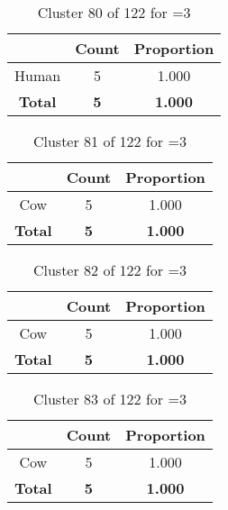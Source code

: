 \clearpage
\begin{table}[ht!]
\centering
\begin{tabular}{|c|c|c|}
\hline
\bf \Spec{} &\bf Count &\bf Proportion\\ \hline \hline
Human & 5 & 1.000\\ \hline
\hline
\bf Total & \bf 5 & \bf 1.000\\ \hline
\end{tabular}
\label{tab:cluster:80:3}
\caption{Cluster 80 of 122 for \minneigh{}=3}
\end{table}

\begin{table}[ht!]
\centering
\begin{tabular}{|c|c|c|}
\hline
\bf \Spec{} &\bf Count &\bf Proportion\\ \hline \hline
Cow & 5 & 1.000\\ \hline
\hline
\bf Total & \bf 5 & \bf 1.000\\ \hline
\end{tabular}
\label{tab:cluster:81:3}
\caption{Cluster 81 of 122 for \minneigh{}=3}
\end{table}

\begin{table}[ht!]
\centering
\begin{tabular}{|c|c|c|}
\hline
\bf \Spec{} &\bf Count &\bf Proportion\\ \hline \hline
Cow & 5 & 1.000\\ \hline
\hline
\bf Total & \bf 5 & \bf 1.000\\ \hline
\end{tabular}
\label{tab:cluster:82:3}
\caption{Cluster 82 of 122 for \minneigh{}=3}
\end{table}

\begin{table}[ht!]
\centering
\begin{tabular}{|c|c|c|}
\hline
\bf \Spec{} &\bf Count &\bf Proportion\\ \hline \hline
Cow & 5 & 1.000\\ \hline
\hline
\bf Total & \bf 5 & \bf 1.000\\ \hline
\end{tabular}
\label{tab:cluster:83:3}
\caption{Cluster 83 of 122 for \minneigh{}=3}
\end{table}

